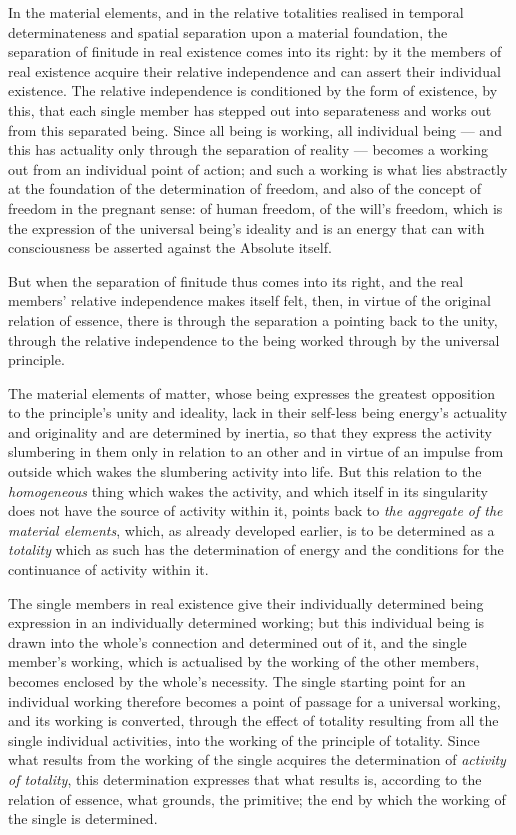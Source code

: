 \documentclass[12pt,a4paper]{book}
\begin{document}
In the material elements, and in the relative totalities realised in temporal
determinateness and spatial separation upon a material foundation, the
separation of finitude in real existence comes into its right: by it the
members of real existence acquire their relative independence and can assert
their individual existence. The relative independence is conditioned by the
form of existence, by this, that each single member has stepped out into
separateness and works out from this separated being. Since all being is
working, all individual being --- and this has actuality only through the
separation of reality --- becomes a working out from an individual point of
action; and such a working is what lies abstractly at the foundation of
the determination of freedom, and also of the concept of freedom in the
pregnant sense: of human freedom, of the will's freedom, which is the
expression of the universal being's ideality and is an energy that can with
consciousness be asserted against the Absolute itself.

But when the separation of finitude thus comes into its right, and the real
members' relative independence makes itself felt, then, in virtue of the
original relation of essence, there is through the separation a pointing back
to the unity, through the relative independence to the being worked through by
the universal principle.

The material elements of matter, whose being expresses the greatest opposition
to the principle's unity and ideality, lack in their self-less being energy's
actuality and originality and are determined by inertia, so that they express
the activity slumbering in them only in relation to an other and in virtue of
an impulse from outside which wakes the slumbering activity into life. But
this relation to the \emph{homogeneous} thing which wakes the activity, and
which itself in its singularity does not have the source of activity within
it, points back to \emph{the aggregate of the material elements}, which, as
already developed earlier, is to be determined as a \emph{totality} which as
such has the determination of energy and the conditions for the continuance of
activity within it.

The single members in real existence give their individually determined being
expression in an individually determined working; but this individual being is
drawn into the whole's connection and determined out of it, and the single
member's working, which is actualised by the working of the other members,
becomes enclosed by the whole's necessity. The single starting point for an
individual working therefore becomes a point of passage for a universal
working, and its working is converted, through the effect of totality
resulting from all the single individual activities, into the working of the
principle of totality. Since what results from the working of the single
acquires the determination of \emph{activity of totality}, this determination
expresses that what results is, according to
the relation of essence, what grounds, the primitive; the end by which the
working of the single is determined.
\end{document}
